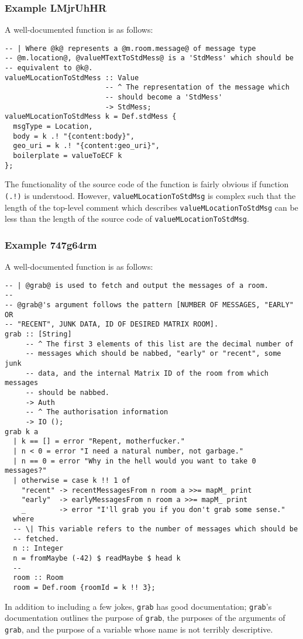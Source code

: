 \documentclass{report}
\begin{document}
\subsubsection{Example LMjrUhHR}
A well-documented function is as follows:
\begin{lstlisting}
-- | Where @k@ represents a @m.room.message@ of message type
-- @m.location@, @valueMTextToStdMess@ is a 'StdMess' which should be
-- equivalent to @k@.
valueMLocationToStdMess :: Value
                        -- ^ The representation of the message which
                        -- should become a 'StdMess'
                        -> StdMess;
valueMLocationToStdMess k = Def.stdMess {
  msgType = Location,
  body = k .! "{content:body}",
  geo_uri = k .! "{content:geo_uri}",
  boilerplate = valueToECF k
};
\end{lstlisting}
The functionality of the source code of the function is fairly obvious if function \texttt{(.!)} is understood.  However, \texttt{valueMLocationToStdMsg} is complex such that the length of the top-level comment which describes \texttt{valueMLocationToStdMsg} can be less than the length of the source code of \texttt{valueMLocationToStdMsg}.
\subsubsection{Example 747g64rm}
A well-documented function is as follows:
\begin{lstlisting}
-- | @grab@ is used to fetch and output the messages of a room.
--
-- @grab@'s argument follows the pattern [NUMBER OF MESSAGES, "EARLY" OR
-- "RECENT", JUNK DATA, ID OF DESIRED MATRIX ROOM].
grab :: [String]
     -- ^ The first 3 elements of this list are the decimal number of
     -- messages which should be nabbed, "early" or "recent", some junk
     -- data, and the internal Matrix ID of the room from which messages
     -- should be nabbed.
     -> Auth
     -- ^ The authorisation information
     -> IO ();
grab k a
  | k == [] = error "Repent, motherfucker."
  | n < 0 = error "I need a natural number, not garbage."
  | n == 0 = error "Why in the hell would you want to take 0 messages?"
  | otherwise = case k !! 1 of
    "recent" -> recentMessagesFrom n room a >>= mapM_ print
    "early"  -> earlyMessagesFrom n room a >>= mapM_ print
    _        -> error "I'll grab you if you don't grab some sense."
  where
  -- \| This variable refers to the number of messages which should be
  -- fetched.
  n :: Integer
  n = fromMaybe (-42) $ readMaybe $ head k
  --
  room :: Room
  room = Def.room {roomId = k !! 3};
\end{lstlisting}
In addition to including a few jokes, \texttt{grab} has good documentation; \texttt{grab}'s documentation outlines the purpose of \texttt{grab}, the purposes of the arguments of \texttt{grab}, and the purpose of a variable whose name is not terribly descriptive.
\end{document}
